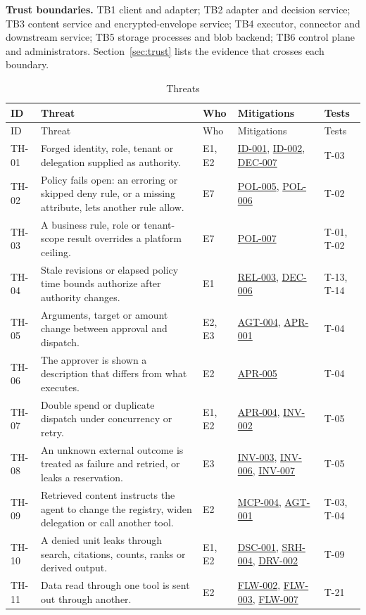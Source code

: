 \documentclass[11pt,a4paper]{article}
\newcommand{\rr}[1]{\hyperlink{req:#1}{#1}}
\begin{document}
\textbf{Trust boundaries.} TB1 client and adapter; TB2 adapter and decision service; TB3 content service and encrypted-envelope service; TB4 executor, connector and downstream service; TB5 storage processes and blob backend; TB6 control plane and administrators. Section~\ref{sec:trust} lists the evidence that crosses each boundary.
\begin{longtable}{@{}P{0.07\textwidth}P{0.34\textwidth}P{0.08\textwidth}P{0.29\textwidth}P{0.12\textwidth}@{}}
\caption{Threats}\label{tab:threats}\\
\toprule ID & Threat & Who & Mitigations & Tests\\\midrule\endfirsthead
\toprule ID & Threat & Who & Mitigations & Tests\\\midrule\endhead
TH-01 & Forged identity, role, tenant or delegation supplied as authority. & E1, E2 & \rr{ID-001}, \rr{ID-002}, \rr{DEC-007} & T-03\\
TH-02 & Policy fails open: an erroring or skipped deny rule, or a missing attribute, lets another rule allow. & E7 & \rr{POL-005}, \rr{POL-006} & T-02\\
TH-03 & A business rule, role or tenant-scope result overrides a platform ceiling. & E7 & \rr{POL-007} & T-01, T-02\\
TH-04 & Stale revisions or elapsed policy time bounds authorize after authority changes. & E1 & \rr{REL-003}, \rr{DEC-006} & T-13, T-14\\
TH-05 & Arguments, target or amount change between approval and dispatch. & E2, E3 & \rr{AGT-004}, \rr{APR-001} & T-04\\
TH-06 & The approver is shown a description that differs from what executes. & E2 & \rr{APR-005} & T-04\\
TH-07 & Double spend or duplicate dispatch under concurrency or retry. & E1, E2 & \rr{APR-004}, \rr{INV-002} & T-05\\
TH-08 & An unknown external outcome is treated as failure and retried, or leaks a reservation. & E3 & \rr{INV-003}, \rr{INV-006}, \rr{INV-007} & T-05\\
TH-09 & Retrieved content instructs the agent to change the registry, widen delegation or call another tool. & E2 & \rr{MCP-004}, \rr{AGT-001} & T-03, T-04\\
TH-10 & A denied unit leaks through search, citations, counts, ranks or derived output. & E1, E2 & \rr{DSC-001}, \rr{SRH-004}, \rr{DRV-002} & T-09\\
TH-11 & Data read through one tool is sent out through another. & E2 & \rr{FLW-002}, \rr{FLW-003}, \rr{FLW-007} & T-21\\

\end{longtable}
\end{document}
